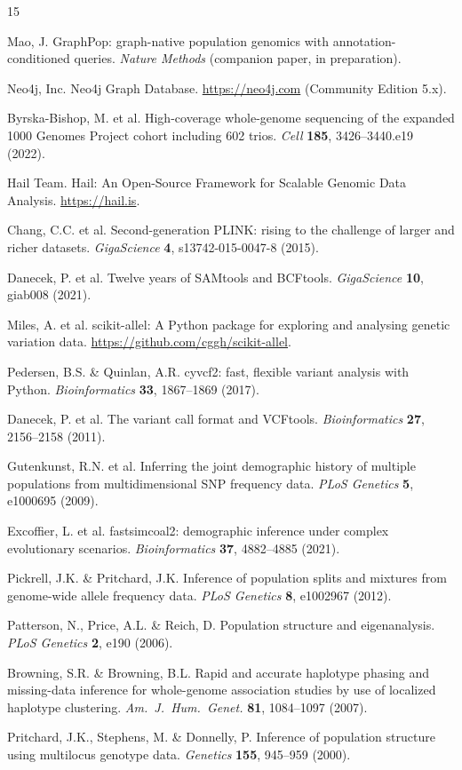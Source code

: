 \documentclass[pdflatex,sn-nature]{sn-jnl}
\begin{document}
\begin{thebibliography}{15}

Mao, J. GraphPop: graph-native population genomics with annotation-conditioned queries. \textit{Nature Methods} (companion paper, in preparation).

Neo4j, Inc. Neo4j Graph Database. \url{https://neo4j.com} (Community Edition 5.x).

Byrska-Bishop, M. et al. High-coverage whole-genome sequencing of the expanded 1000 Genomes Project cohort including 602 trios. \textit{Cell} \textbf{185}, 3426--3440.e19 (2022).

Hail Team. Hail: An Open-Source Framework for Scalable Genomic Data Analysis. \url{https://hail.is}.

Chang, C.C. et al. Second-generation PLINK: rising to the challenge of larger and richer datasets. \textit{GigaScience} \textbf{4}, s13742-015-0047-8 (2015).

Danecek, P. et al. Twelve years of SAMtools and BCFtools. \textit{GigaScience} \textbf{10}, giab008 (2021).

Miles, A. et al. scikit-allel: A Python package for exploring and analysing genetic variation data. \url{https://github.com/cggh/scikit-allel}.

Pedersen, B.S. \& Quinlan, A.R. cyvcf2: fast, flexible variant analysis with Python. \textit{Bioinformatics} \textbf{33}, 1867--1869 (2017).

Danecek, P. et al. The variant call format and VCFtools. \textit{Bioinformatics} \textbf{27}, 2156--2158 (2011).

Gutenkunst, R.N. et al. Inferring the joint demographic history of multiple populations from multidimensional SNP frequency data. \textit{PLoS Genetics} \textbf{5}, e1000695 (2009).

Excoffier, L. et al. fastsimcoal2: demographic inference under complex evolutionary scenarios. \textit{Bioinformatics} \textbf{37}, 4882--4885 (2021).

Pickrell, J.K. \& Pritchard, J.K. Inference of population splits and mixtures from genome-wide allele frequency data. \textit{PLoS Genetics} \textbf{8}, e1002967 (2012).

Patterson, N., Price, A.L. \& Reich, D. Population structure and eigenanalysis. \textit{PLoS Genetics} \textbf{2}, e190 (2006).

Browning, S.R. \& Browning, B.L. Rapid and accurate haplotype phasing and missing-data inference for whole-genome association studies by use of localized haplotype clustering. \textit{Am.\ J.\ Hum.\ Genet.} \textbf{81}, 1084--1097 (2007).

Pritchard, J.K., Stephens, M. \& Donnelly, P. Inference of population structure using multilocus genotype data. \textit{Genetics} \textbf{155}, 945--959 (2000).

\end{thebibliography}
\end{document}
